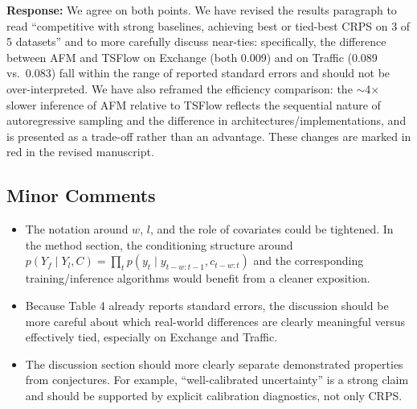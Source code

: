 \documentclass[11pt]{article}
\newcommand{\reviewertext}[1]{%
  \begin{reviewerquote}
    {\color{reviewercolor}\itshape #1}
  \end{reviewerquote}%
}
\newcommand{\authorresponse}[1]{%
  \textbf{Response:} #1\par\medskip
}
\begin{document}
\authorresponse{%
We agree on both points. We have revised the results paragraph to read ``competitive with strong baselines, achieving best or tied-best CRPS on 3 of 5 datasets'' and to more carefully discuss near-ties: specifically, the difference between AFM and TSFlow on Exchange (both 0.009) and on Traffic (0.089 vs.\ 0.083) fall within the range of reported standard errors and should not be over-interpreted. We have also reframed the efficiency comparison: the $\sim$4$\times$ slower inference of AFM relative to TSFlow reflects the sequential nature of autoregressive sampling and the difference in architectures/implementations, and is presented as a trade-off rather than an advantage. These changes are marked in red in the revised manuscript.
}

\subsection{Minor Comments}

\reviewertext{%
\begin{itemize}[nosep]
  \item The notation around $w$, $l$, and the role of covariates could be tightened. In the method section, the conditioning structure around $p(Y_f \mid Y_l, C) = \prod_t p(y_t \mid y_{t-w:t-1}, c_{t-w:t})$ and the corresponding training/inference algorithms would benefit from a cleaner exposition.
  \item Because Table 4 already reports standard errors, the discussion should be more careful about which real-world differences are clearly meaningful versus effectively tied, especially on Exchange and Traffic.
  \item The discussion section should more clearly separate demonstrated properties from conjectures. For example, ``well-calibrated uncertainty'' is a strong claim and should be supported by explicit calibration diagnostics, not only CRPS.
\end{itemize}
}
\end{document}
